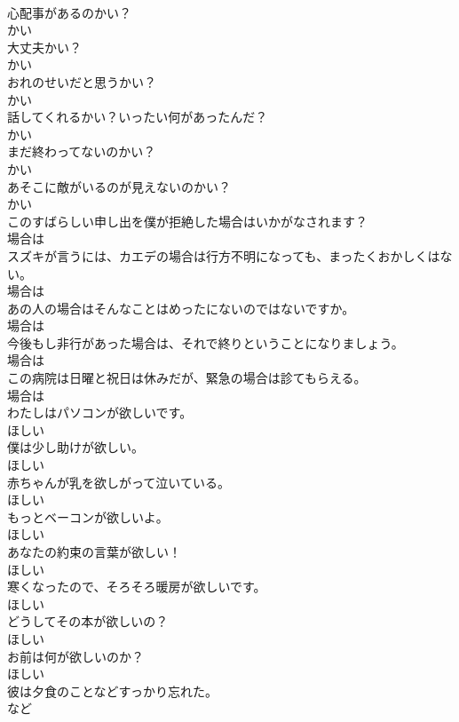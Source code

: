 \documentclass[8pt]{extreport}
\begin{document}
\begin{CJK}{UTF8}{min}
\\	心配事があるのかい？	
\\	かい
\\	大丈夫かい？	
\\	かい
\\	おれのせいだと思うかい？	
\\	かい
\\	話してくれるかい？いったい何があったんだ？	
\\	かい
\\	まだ終わってないのかい？	
\\	かい
\\	あそこに敵がいるのが見えないのかい？	
\\	かい
\\	このすばらしい申し出を僕が拒絶した場合はいかがなされます？	
\\	場合は
\\	スズキが言うには、カエデの場合は行方不明になっても、まったくおかしくはない。	
\\	場合は
\\	あの人の場合はそんなことはめったにないのではないですか。	
\\	場合は
\\	今後もし非行があった場合は、それで終りということになりましょう。	
\\	場合は
\\	この病院は日曜と祝日は休みだが、緊急の場合は診てもらえる。	
\\	場合は
\\	わたしはパソコンが欲しいです。	
\\	ほしい
\\	僕は少し助けが欲しい。	
\\	ほしい
\\	赤ちゃんが乳を欲しがって泣いている。	
\\	ほしい
\\	もっとベーコンが欲しいよ。	
\\	ほしい
\\	あなたの約束の言葉が欲しい！	
\\	ほしい
\\	寒くなったので、そろそろ暖房が欲しいです。	
\\	ほしい
\\	どうしてその本が欲しいの？	
\\	ほしい
\\	お前は何が欲しいのか？	
\\	ほしい
\\	彼は夕食のことなどすっかり忘れた。	
\\	など

\end{CJK}
\end{document}
